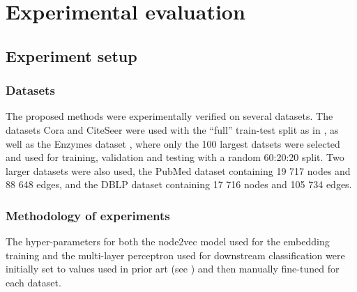 \section{Experimental evaluation}\label{sec:experimental-evaluation}

\subsection{Experiment setup}

\subsubsection{Datasets}

The proposed methods were experimentally verified on several datasets. The datasets Cora and CiteSeer \cite{yang_revisiting_2016} were used with the \enquote{full} train-test split as in \cite{chen_fastgcn_2018}, as well as the Enzymes dataset \cite{morris_tudataset_2020}, where only the 100 largest datsets were selected and used for training, validation and testing with a random 60:20:20 split. Two larger datasets were also used, the PubMed dataset \cite{yang_revisiting_2016} containing 19 717 nodes and 88 648 edges, and the DBLP dataset \cite{bojchevski_deep_2018} containing 17 716 nodes and 105 734 edges.

\subsubsection{Methodology of experiments}

The hyper-parameters for both the node2vec model used for the embedding training and the multi-layer perceptron used for downstream classification were initially set to values used in prior art (see \cite{hu_open_2021, fey_fast_2019}) and then manually fine-tuned for each dataset.

